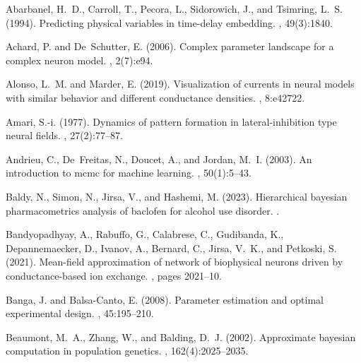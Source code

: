 \documentclass[12pt]{article}
\begin{document}



\begin{thebibliography}{}

Abarbanel, H.~D., Carroll, T., Pecora, L., Sidorowich, J., and Tsimring, L.~S.
  (1994).
\newblock Predicting physical variables in time-delay embedding.
, 49(3):1840.

Achard, P. and De~Schutter, E. (2006).
\newblock Complex parameter landscape for a complex neuron model.
, 2(7):e94.

Alonso, L.~M. and Marder, E. (2019).
\newblock Visualization of currents in neural models with similar behavior and
  different conductance densities.
, 8:e42722.

Amari, S.-i. (1977).
\newblock Dynamics of pattern formation in lateral-inhibition type neural
  fields.
, 27(2):77--87.

Andrieu, C., De~Freitas, N., Doucet, A., and Jordan, M.~I. (2003).
\newblock An introduction to mcmc for machine learning.
, 50(1):5--43.

Baldy, N., Simon, N., Jirsa, V., and Hashemi, M. (2023).
\newblock Hierarchical bayesian pharmacometrics analysis of baclofen for
  alcohol use disorder.
.

Bandyopadhyay, A., Rabuffo, G., Calabrese, C., Gudibanda, K., Depannemaecker,
  D., Ivanov, A., Bernard, C., Jirsa, V.~K., and Petkoski, S. (2021).
\newblock Mean-field approximation of network of biophysical neurons driven by
  conductance-based ion exchange.
, pages 2021--10.

Banga, J. and Balsa-Canto, E. (2008).
\newblock Parameter estimation and optimal experimental design.
, 45:195--210.

Beaumont, M.~A., Zhang, W., and Balding, D.~J. (2002).
\newblock Approximate bayesian computation in population genetics.
, 162(4):2025--2035.


\end{thebibliography}
\end{document}
